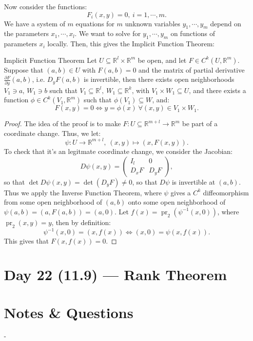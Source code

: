 \documentclass[11pt]{article}
\newenvironment{theorem}[1]{\begin{thmbox}{#1}{}}{\end{thmbox}}
\theoremstyle{quiet}
\theoremstyle{quietremark}
\begin{document}
Now consider the functions:
\[
F_i(x,y)=0,~i=1,\cdots,m.
\]
We have a system of $m$ equations for $m$ unknown variables $y_1,\cdots,y_m$ depend on the parameters $x_1,\cdots,x_l$. We want to solve for $y_1,\cdots,y_m$ on functions of parameters $x_i$ locally. Then, this gives the Implicit Function Theorem:
\begin{theorem}{Implicit Function Theorem}
Let $U\subseteq\mathbb{R}^l\times\mathbb{R}^m$ be open, and let $F\in C^k(U,\mathbb{R}^m)$. Suppose that $(a,b)\in U$ with $F(a,b)=0$ and the matrix of partial derivative $\frac{\partial F}{\partial y}(a,b)$, i.e. $D_yF(a,b)$ is invertible, then there exists open neighborhoods $V_1\ni a$, $W_1\ni b$ such that $V_1\subseteq\mathbb{R}^l,~W_1\subseteq\mathbb{R}^k$, with $V_1\times W_1\subseteq U$, and there exists a function $\phi\in C^k(V_1,\mathbb{R}^m)$ such that $\phi(V_1)\subseteq W$, and:
\[
F(x,y)=0\Leftrightarrow y=\phi(x)~\forall(x,y)\in V_1\times W_1.
\]
\end{theorem}

\begin{proof}
The idea of the proof is to make $F:U\subseteq\mathbb{R}^{m+l}\to\mathbb{R}^m$ be part of a coordinate change. Thus, we let:
\[
\psi:U\to\mathbb{R}^{m+l},~(x,y)\mapsto(x,F(x,y)).
\]
To check that it's an legitmate coordinate change, we consider the Jacobian:
\[
D\psi(x,y)=\left(\begin{array}{c|c}
I_l & 0\\
\hline 
D_xF & D_yF
\end{array}\right),
\]
so that $\det D\psi(x,y)=\det(D_yF)\ne 0$, so that $D\psi$ is invertible at $(a,b)$. Thus we apply the Inverse Function Theorem, where $\psi$ gives a $C^k$ diffeomorphism from some  open neighborhood of $(a,b)$ onto some open neighborhood of $\psi(a,b)=(a,F(a,b))=(a,0)$. Let $f(x)=\operatorname{pr}_2(\psi^{-1}(x,0))$, where $\operatorname{pr}_2(x,y)=y$, then by definition:
\[
\psi^{-1}(x,0)=(x,f(x))\Leftrightarrow (x,0)=\psi(x,f(x)).
\]
This gives that $F(x,f(x))=0$.
\end{proof}


\newpage
\section{Day 22 (11.9) --- Rank Theorem}


\newpage
\section*{Notes \& Questions}

\begin{tcolorbox}[colback=black!2, colframe=neutralColor!40, arc=1.5mm, breakable]
\begin{itemize}[leftmargin=*]
-
\end{itemize}
\end{tcolorbox}
\end{document}
